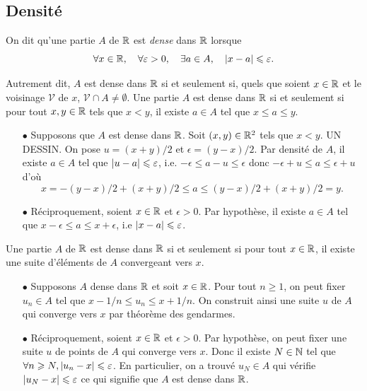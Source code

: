 \documentclass{magnoliaold}
\begin{document}
\subsection{Densité}


\begin{definition}[utile=-3]
On dit qu'une partie $A$  de $\mathbb{R}$ est \emph{dense} dans $\mathbb{R}$ lorsque
  \[\forall x\in\mathbb{R} ,\quad \forall \varepsilon>0 ,\quad \exists a\in A ,\quad
    \left|x-a\right|\leqslant\varepsilon.\]
  \end{definition}
  
  \begin{remarques}
  \remarque Autrement dit, $A$ est dense dans $\mathbb{R}$ si et seulement si, quels que soient
    $x\in\mathbb{R}$ et le voisinage $\mathcal{V}$ de $x$,
    $\mathcal{V}\cap A\neq\emptyset$.
  \remarque Une partie $A$ est dense dans $\mathbb{R}$ si et seulement si pour tout
    $x,y\in\mathbb{R}$ tels que $x<y$, il existe $a\in A$ tel que $x\leq a\leq y$.
  \end{remarques}
  
  \begin{sol}
  \begin{itemize}
  \item[$\bullet$] Supposons que $A$ est dense dans $\mathbb{R}$. Soit $(x,y)\in \mathbb{R}^2$ tels que $x<y$. UN DESSIN. On pose $u=(x+y)/2$ et $\epsilon=(y-x)/2$. Par densité de $A$, il existe $a\in A$ tel que $\left|u-a\right|\leqslant \varepsilon$, i.e. $-\epsilon \leq a-u\leq \epsilon$ donc $-\epsilon+u \leq a \leq \epsilon+u$ d'où $$x=-(y-x)/2+(x+y)/2 \leq a \leq (y-x)/2+(x+y)/2=y.$$
  \item[$\bullet$] Réciproquement, soient $x\in \mathbb{R}$ et $\epsilon>0$. Par hypothèse, il existe $a\in A$ tel que $x-\epsilon\leq a \leq x+\epsilon$, i.e $\left|x-a\right|\leqslant \varepsilon$.
  \end{itemize}
  
  \end{sol}
  
  \begin{proposition}[utile=-3]
  Une partie $A$ de $\mathbb{R}$ est dense dans $\mathbb{R}$ si et seulement si pour tout $x\in\mathbb{R}$, il existe
  une suite d'éléments de $A$ convergeant vers $x$.
  \end{proposition}
  
  \begin{preuve}
  \begin{itemize}
  \item[$\bullet$] Supposons $A$ dense dans $\mathbb{R}$ et soit $x\in \mathbb{R}$. Pour tout $n\geq 1$, on peut fixer $u_n \in A$ tel que $x-1/n\leq u_n\leq x+1/n$. On construit ainsi une suite $u$ de $A$ qui converge vers $x$ par théorème des gendarmes.
  \item[$\bullet$] Réciproquement, soient $x\in \mathbb{R}$ et $\epsilon>0$.
  Par hypothèse, on peut fixer une suite $u$ de points de $A$ qui converge vers $x$. Donc il existe $N\in \mathbb{N}$ tel que $\forall n\geqslant N, \left|u_n-x\right|\leqslant \varepsilon$. En particulier, on a trouvé $u_N \in A$ qui vérifie $\left|u_N-x\right|\leqslant \varepsilon$ ce qui signifie que $A$ est dense dans $\mathbb{R}$.
  \end{itemize}
  \end{preuve}
  
\end{document}
